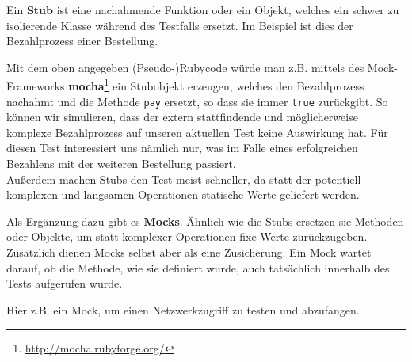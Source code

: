   Ein \textbf{Stub} ist eine nachahmende Funktion oder ein Objekt, welches ein schwer zu isolierende Klasse während des Testfalls ersetzt. Im Beispiel ist dies der Bezahlprozess einer Bestellung.
%
%
%
%
\begin{ruby}[label=test\_bestellung.rb]
 

    

   
\end{ruby}

Mit dem oben angegeben (Pseudo-)Rubycode würde man z.B. mittels des Mock\hyp{}Frameworks \textbf{mocha}\footnote{\url{http://mocha.rubyforge.org/}} ein Stubobjekt erzeugen, welches den Bezahlprozess nachahmt und die Methode \texttt{pay} ersetzt, so dass sie immer \texttt{true} zurückgibt. So können wir simulieren, dass der extern stattfindende und möglicherweise komplexe Bezahlprozess auf unseren aktuellen Test keine Auswirkung hat. Für diesen Test interessiert uns nämlich nur, was im Falle eines erfolgreichen Bezahlens mit der weiteren Bestellung passiert.\\
  Außerdem machen Stubs den Test meist schneller, da statt der potentiell komplexen und langsamen Operationen statische Werte geliefert werden.

  Als Ergänzung dazu gibt es \textbf{Mocks}. Ähnlich wie die Stubs ersetzen sie Methoden oder Objekte, um statt komplexer Operationen fixe Werte zurückzugeben. Zusätzlich dienen Mocks selbst aber als eine Zusicherung. Ein Mock wartet darauf, ob die Methode, wie sie definiert wurde, auch tatsächlich innerhalb des Tests aufgerufen wurde.

  Hier z.B. ein Mock, um einen Netzwerkzugriff zu testen und abzufangen.
%
%
\begin{ruby}[label=test\_http.rb]
 
\end{ruby}

